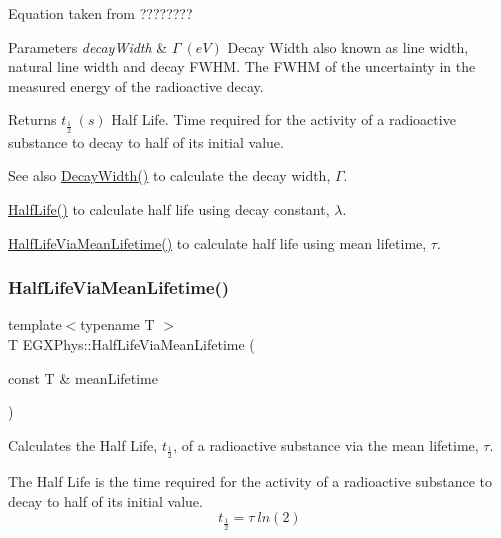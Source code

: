 Equation taken from ????????


\begin{DoxyParams}{Parameters}
{\em decay\+Width} & $\Gamma\ (eV)$ Decay Width also known as line width, natural line width and decay F\+W\+HM. The F\+W\+HM of the uncertainty in the measured energy of the radioactive decay. \\
\hline
\end{DoxyParams}
\begin{DoxyReturn}{Returns}
$t_{\frac{1}{2}}\ (s)$ Half Life. Time required for the activity of a radioactive substance to decay to half of its initial value. 
\end{DoxyReturn}
\begin{DoxySeeAlso}{See also}
\mbox{\hyperlink{group___decay_width_gae232ec8bb39710131be898c057a25620}{Decay\+Width()}} to calculate the decay width, $\Gamma$. 

\mbox{\hyperlink{group___half_life_ga21d268f154fb91c1c556bbfa7fe83ac1}{Half\+Life()}} to calculate half life using decay constant, $\lambda$. 

\mbox{\hyperlink{group___half_life_gacddef16b62e98b214ec8dd8af7da7dce}{Half\+Life\+Via\+Mean\+Lifetime()}} to calculate half life using mean lifetime, $\tau$. 
\end{DoxySeeAlso}
\mbox{\label{group___half_life_gacddef16b62e98b214ec8dd8af7da7dce}} 
\subsubsection{\texorpdfstring{Half\+Life\+Via\+Mean\+Lifetime()}{HalfLifeViaMeanLifetime()}}
{\footnotesize\ttfamily template$<$typename T $>$ \\
T E\+G\+X\+Phys\+::\+Half\+Life\+Via\+Mean\+Lifetime (\begin{DoxyParamCaption}\item[{const T \&}]{mean\+Lifetime }\end{DoxyParamCaption})}



Calculates the Half Life, $t_{\frac{1}{2}}$, of a radioactive substance via the mean lifetime, $\tau$. 

The Half Life is the time required for the activity of a radioactive substance to decay to half of its initial value. \[t_{\frac{1}{2}}= \tau \ ln(2)\]

